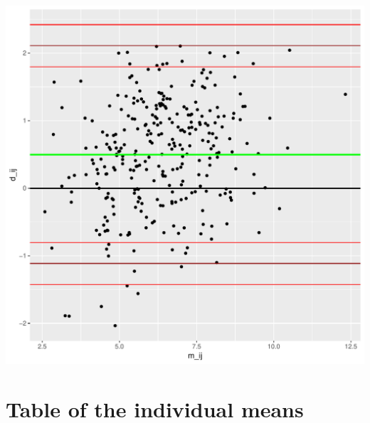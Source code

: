 \documentclass{article}\usepackage[]{graphicx}\usepackage[]{color}
\makeatletter
\def\maxwidth{ %
  \ifdim\Gin@nat@width>\linewidth
    \linewidth
  \else
    \Gin@nat@width
  \fi
}
\newenvironment{knitrout}{}{} %
\makeatother
\begin{document}
\begin{knitrout}
\color{fgcolor}
\includegraphics[width=\maxwidth]{figure/analysisResults_plot-1} 

\end{knitrout}

\section{Table of the individual means}
\end{document}
